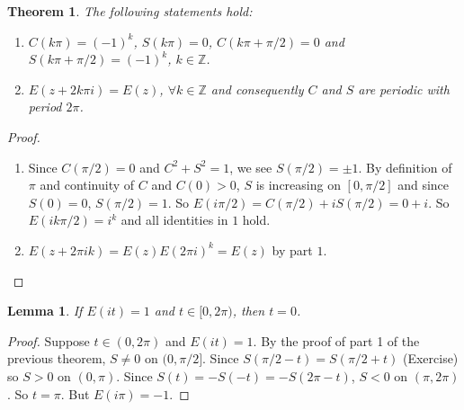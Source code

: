 \documentclass[12pt]{article}
\theoremstyle{plain}
\newtheorem{thm}{Theorem}
\newtheorem*{lemma}{Lemma}
\theoremstyle{definition}
\begin{document}
\begin{thm}
    The following statements hold:
    \begin{enumerate}
        \item $C(k\pi) = (-1)^k$, $S(k\pi) = 0$, $C(k\pi + \pi/2) = 0$ and $S(k\pi + \pi/2) = (-1)^k$, $k\in\mathbb{Z}$.
        \item $E(z+2k \pi i) = E(z)$, $\forall k\in\mathbb{Z}$ and consequently $C$ and $S$ are periodic with period
            $2\pi$.
    \end{enumerate}
\end{thm}
\begin{proof}
    \begin{enumerate}
        \item Since $C(\pi/2) = 0$ and $C^2+S^2 = 1$, we see $S(\pi/2) = \pm 1$.
            By definition of $\pi$ and continuity of $C$ and $C(0)>0$, $S$ is increasing on $[0,\pi/2]$ and since $S(0) =
            0$, $S(\pi/2) = 1$.
            So $E(i\pi/2) = C(\pi/2) + iS(\pi/2) = 0 + i$.
            So $E(i k \pi/2) = i^k$ and all identities in $1$ hold.
        \item $E(z+2\pi i k) = E(z)E(2\pi i)^k = E(z)$ by part $1$.
    \end{enumerate}
\end{proof}

\begin{lemma}
    If $E(it) = 1$ and $t\in[0,2\pi)$, then $t = 0$.
\end{lemma}
\begin{proof}
    Suppose $t\in (0,2\pi)$ and $E(it) = 1$. By the proof of part 1 of the previous theorem, $S\neq 0$ on $(0,\pi/2]$.
    Since $S(\pi/2 - t) = S(\pi/2 + t)$ (Exercise) so $S>0$ on $(0,\pi)$.
    Since $S(t) = -S(-t) = -S(2\pi - t)$, $S<0$ on $(\pi, 2\pi)$.
    So $t=\pi$.
    But $E(i\pi) = -1$.
\end{proof}
\end{document}

